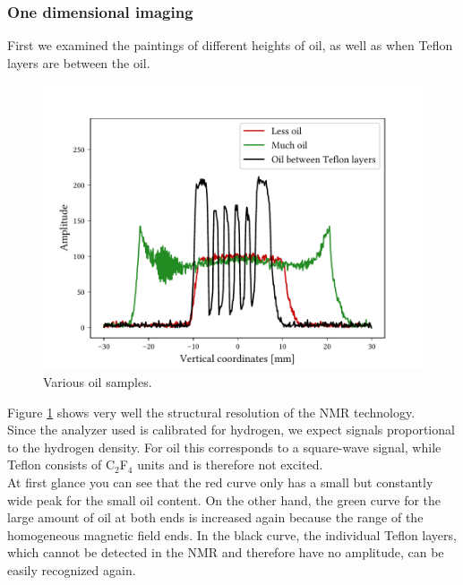 \subsubsection{One dimensional imaging}
First we examined the paintings of different heights of oil, as well as when Teflon layers are between the oil.
\begin{figure}[ht]
\centering
\includegraphics[scale=.6]{..//figures//f61_abb_8.pdf}
\caption{Various oil samples.}
\label{fig:oil}
\end{figure}
Figure \ref{fig:oil} shows very well the structural resolution of the NMR technology.\\
Since the analyzer used is calibrated for hydrogen, we expect signals proportional to the hydrogen density.
For oil this corresponds to a square-wave signal, while Teflon consists of C$_2$F$_4$ units and is therefore not excited.\\
At first glance you can see that the red curve only has a small but constantly wide peak for the small oil content.
On the other hand, the green curve for the large amount of oil at both ends is increased again because the range of the homogeneous magnetic field ends.
In the black curve, the individual Teflon layers, which cannot be detected in the NMR and therefore have no amplitude, can be easily recognized again.\\

